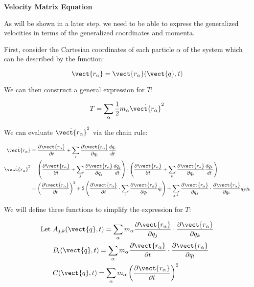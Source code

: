 \textbf{Velocity Matrix Equation}

As will be shown in a later step, we need to be able to express the generalized velocities in terms of the generalized coordinates and momenta.

First, consider the Cartesian coordinates of each particle $\alpha$ of the system which can be described by the function:

\[
    \vect{r_\alpha} = \vect{r_\alpha}(\vect{q}, t)
\]

We can then construct a general expression for $T$:

\[
    T = \sum_\alpha \frac{1}{2} m_\alpha {\Dot{\vect{r_\alpha}}}^2\\
\]

We can evaluate ${\Dot{\vect{r_\alpha}}}^2$ via the chain rule:

\begin{align*}
    \Dot{\vect{r_\alpha}} &= \frac{\partial \vect{r_\alpha}}{\partial t} +  \sum_i \frac{\partial \vect{r_\alpha}}{\partial q_i} \frac{d q_i}{d t}\\
    {\Dot{\vect{r_\alpha}}}^2 &= \left( \frac{\partial \vect{r_\alpha}}{\partial t} +  \sum_j \frac{\partial \vect{r_\alpha}}{\partial q_j} \frac{d q_j}{d t} \right) \cdot \left( \frac{\partial \vect{r_\alpha}}{\partial t} +  \sum_k \frac{\partial \vect{r_\alpha}}{\partial q_k} \frac{d q_k}{d t} \right)\\
    &= \left( \frac{\partial \vect{r_\alpha}}{\partial t} \right)^2 + 2 \left( \frac{\partial \vect{r_\alpha}}{\partial t} \cdot \sum_l \frac{\partial \vect{r_\alpha}}{\partial q_l} \Dot{q_l} \right) + \sum_{j,k} \frac{\partial \vect{r_\alpha}}{\partial q_j} \cdot \frac{\partial \vect{r_\alpha}}{\partial q_k} \Dot{q_j} \Dot{q_k}
\end{align*}

We will define three functions to simplify the expression for $T$:

\begin{align*}
    \text{Let } &A_{j,k}(\vect{q}, t) = \sum_\alpha m_\alpha \frac{\partial \vect{r_\alpha}}{\partial q_j} \cdot \frac{\partial \vect{r_\alpha}}{\partial q_k}\\
    &B_l(\vect{q}, t) = \sum_\alpha m_\alpha \frac{\partial \vect{r_\alpha}}{\partial t} \cdot \frac{\partial \vect{r_\alpha}}{\partial q_l}\\
    &C(\vect{q}, t) = \sum_\alpha m_\alpha \left( \frac{\partial \vect{r_\alpha}}{\partial t} \right)^2
\end{align*}

